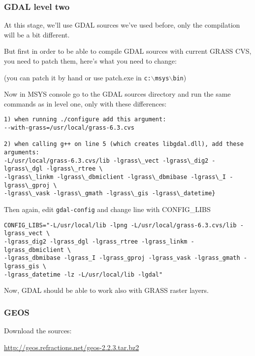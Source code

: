 \subsubsection{GDAL level two}
At this stage, we'll use GDAL sources we've used before, only the compilation will be a bit different.

But first in order to be able to compile GDAL sources with current GRASS CVS, you need to patch them, here's what you need to change:

	\begin{quotation}
	\end{quotation}
(you can patch it by hand or use patch.exe in \texttt{c:$\backslash$msys$\backslash$bin})

Now in MSYS console go to the GDAL sources directory and run the same commands as in level one, only with these differences:

\begin{verbatim}
1) when running ./configure add this argument:
--with-grass=/usr/local/grass-6.3.cvs

2) when calling g++ on line 5 (which creates libgdal.dll), add these arguments: 
-L/usr/local/grass-6.3.cvs/lib -lgrass\_vect -lgrass\_dig2 -lgrass\_dgl -lgrass\_rtree \
-lgrass\_linkm -lgrass\_dbmiclient -lgrass\_dbmibase -lgrass\_I -lgrass\_gproj \ 
-lgrass\_vask -lgrass\_gmath -lgrass\_gis -lgrass\_datetime}
\end{verbatim}

Then again, edit \texttt{gdal-config} and change line with CONFIG\_LIBS

\begin{verbatim}
CONFIG_LIBS="-L/usr/local/lib -lpng -L/usr/local/grass-6.3.cvs/lib -lgrass_vect \
-lgrass_dig2 -lgrass_dgl -lgrass_rtree -lgrass_linkm -lgrass_dbmiclient \
-lgrass_dbmibase -lgrass_I -lgrass_gproj -lgrass_vask -lgrass_gmath -lgrass_gis \
-lgrass_datetime -lz -L/usr/local/lib -lgdal" 
\end{verbatim}

Now, GDAL should be able to work also with GRASS raster layers.

\subsubsection{GEOS}
Download the sources:

\url{http://geos.refractions.net/geos-2.2.3.tar.bz2}


